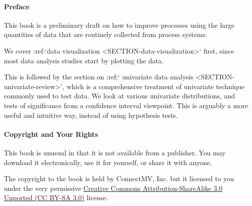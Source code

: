\paragraph{Preface}





This book is a preliminary draft on how to improve processes using the large quantities of data that are routinely collected from process systems.

We cover :ref:`data visualization <SECTION-data-visualization>` first, since most data analysis studies start by plotting the data. 

This is followed by the section on :ref:` univariate data analysis <SECTION-univariate-review>', which is a comprehensive treatment of univariate technique commonly used to test data. We look at various univariate distributions, and tests of significance from a confidence interval viewpoint. This is arguably a more useful and intuitive way, instead of using hypothesis tests.


\vskip24pt

\paragraph{Copyright and Your Rights}

This book is unusual in that it is not available from a publisher. You may download it electronically, use it for yourself, or share it with anyone.

The copyright to the book is held by ConnectMV, Inc. but it licensed to you under the very permissive \href{http://creativecommons.org/licenses/by-sa/3.0/}{Creative Commons Attribution-ShareAlike 3.0 Unported (CC BY-SA 3.0)} license.

